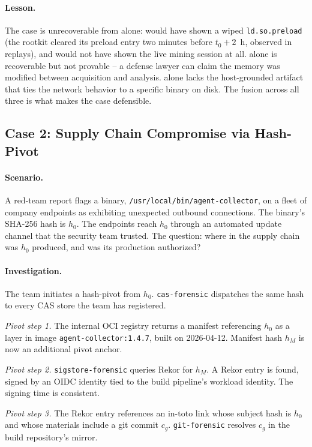 \paragraph{Lesson.}
The case is unrecoverable from  alone:  would have shown a
wiped \texttt{ld.so.preload} (the rootkit cleared its preload entry two
minutes before $t_0 + 2$~h, observed in  replays), and would not
have shown the live mining session at all.  alone is recoverable
but not provable -- a defense lawyer can claim the memory was modified
between acquisition and analysis.  alone lacks the host-grounded
artifact that ties the network behavior to a specific binary on disk.
The fusion across all three is what makes the case defensible.

\subsection{Case 2: Supply Chain Compromise via Hash-Pivot}
\label{sec:case2}

\paragraph{Scenario.}
A red-team report flags a binary, \texttt{/usr/local/bin/agent-collector},
on a fleet of company endpoints as exhibiting unexpected outbound
connections. The binary's SHA-256 hash is $h_0$. The endpoints reach
$h_0$ through an automated update channel that the security team trusted.
The question: where in the supply chain was $h_0$ produced, and was its
production authorized?

\paragraph{Investigation.}
The team initiates a hash-pivot from $h_0$. \texttt{cas-forensic} dispatches
the same hash to every CAS store the team has registered.

\noindent\emph{Pivot step 1.} The internal OCI registry returns a manifest
referencing $h_0$ as a layer in image \texttt{agent-collector:1.4.7}, built
on 2026-04-12. Manifest hash $h_M$ is now an additional pivot anchor.

\noindent\emph{Pivot step 2.} \texttt{sigstore-forensic} queries Rekor for
$h_M$. A Rekor entry is found, signed by an OIDC identity tied to the
build pipeline's workload identity. The signing time is consistent.

\noindent\emph{Pivot step 3.} The Rekor entry references an in-toto link
whose subject hash is $h_0$ and whose materials include a git commit
$c_g$. \texttt{git-forensic} resolves $c_g$ in the build repository's
mirror.

